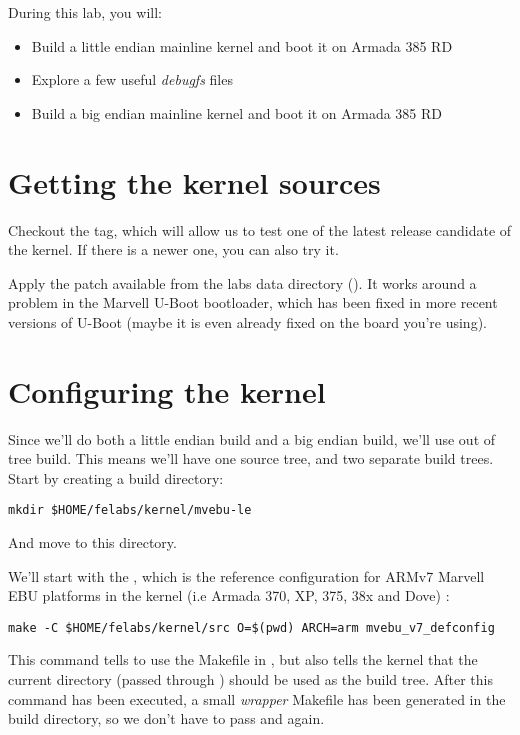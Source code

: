 
During this lab, you will:

\begin{itemize}
\item Build a little endian mainline kernel and boot it on Armada 385 RD
\item Explore a few useful {\em debugfs} files
\item Build a big endian mainline kernel and boot it on Armada 385 RD
\end{itemize}

\section{Getting the kernel sources}

Checkout the  tag, which will allow us to test one of
the latest release candidate of the kernel. If there is a newer one,
you can also try it.

Apply the  patch available from the labs data
directory (). It works around
a problem in the Marvell U-Boot bootloader, which has been fixed in
more recent versions of U-Boot (maybe it is even already fixed on the
board you're using).

\section{Configuring the kernel}

Since we'll do both a little endian build and a big endian build,
we'll use out of tree build. This means we'll have one source tree,
and two separate build trees. Start by creating a build directory:

\begin{verbatim}
mkdir $HOME/felabs/kernel/mvebu-le
\end{verbatim}

And move to this directory.

We'll start with the , which is the reference
configuration for ARMv7 Marvell EBU platforms in the kernel (i.e
Armada 370, XP, 375, 38x and Dove) :

\begin{verbatim}
make -C $HOME/felabs/kernel/src O=$(pwd) ARCH=arm mvebu_v7_defconfig
\end{verbatim}

This command tells  to use the Makefile in
, but also tells the kernel that the
current directory (passed through ) should be used as the
build tree. After this command has been executed, a small {\em
  wrapper} Makefile has been generated in the build directory, so we
don't have to pass  and  again.

